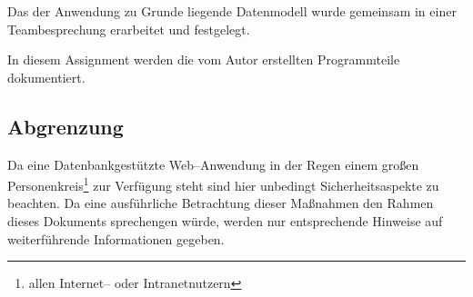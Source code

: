 Das der Anwendung zu Grunde liegende Datenmodell wurde gemeinsam in einer Teambesprechung erarbeitet und festgelegt.

In diesem Assignment werden die vom Autor erstellten Programmteile dokumentiert.

\subsection{Abgrenzung}

Da eine Datenbankgestützte Web--Anwendung in der Regen einem großen Personenkreis\footnote{allen Internet-- oder Intranetnutzern} zur Verfügung steht sind hier unbedingt Sicherheitsaspekte zu beachten. Da eine ausführliche Betrachtung dieser Maßnahmen den Rahmen dieses Dokuments sprechengen würde, werden nur entsprechende Hinweise auf weiterführende Informationen gegeben.